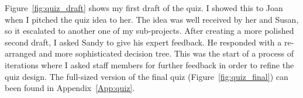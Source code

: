 Figure~\ref{fig:quiz_draft} shows my first draft of the quiz.
I showed this to Joan when I pitched the quiz idea to her.
The idea was well received by her and Susan, so it escalated to another one of my sub-projects.
After creating a more polished second draft, I asked Sandy to give his expert feedback.
He responded with a re-arranged and more sophisticated decision tree.
This was the start of a process of iterations where I asked staff members for further feedback in order to refine the quiz design.
The full-sized version of the final quiz (Figure~\ref{fig:quiz_final}) can been found in Appendix~\ref{App:quiz}.




